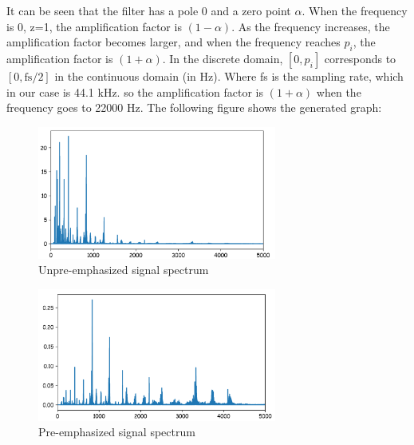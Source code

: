 It can be seen that the filter has a pole 0 and a zero point $\alpha$. When the frequency is 0, z=1, the amplification factor is $(1-\alpha)$. As the frequency increases, the amplification factor becomes larger, and when the frequency reaches $p_{i}$, the amplification factor is $(1+ \alpha)$. In the discrete domain, $[0, p_{i}]$ corresponds to $[0, \mathrm{fs} / 2]$ in the continuous domain (in Hz). Where fs is the sampling rate, which in our case is 44.1 kHz. so the amplification factor is $(1+ \alpha)$ when the frequency goes to 22000 Hz. The following figure shows the generated graph:
\begin{figure}[!htbp]
	\centering
	\includegraphics[width = 0.7\textwidth]{figures_ning/audio_2.png}
	\caption[Unpre-emphasized signal spectrum]
	{ Unpre-emphasized signal spectrum}
	\label{fig:audio_2}
\end{figure}

\begin{figure}[!htbp]
	\centering
	\includegraphics[width = 0.7\textwidth]{figures_ning/audio_3.png}
	\caption[Pre-emphasized signal spectrum]
	{ Pre-emphasized signal spectrum}
	\label{fig:audio_3}
\end{figure}


